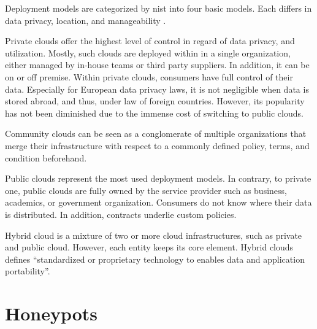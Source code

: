 Deployment models are categorized by \ac{nist} into four basic models.
Each differs in data privacy, location, and manageability \cite{Mell2011}.

Private clouds offer the highest level of control in regard of data privacy, and utilization. Mostly, such clouds are deployed within in a single organization, either managed by in-house teams or third party suppliers.
In addition, it can be on or off premise.
Within private clouds, consumers have full control of their data.
Especially for European data privacy laws, it is not negligible when data is stored abroad, and thus, under law of foreign countries.
However, its popularity has not been diminished due to the immense cost of switching to public clouds. \cite{Dillon2010, Mell2011}

Community clouds can be seen as a conglomerate of multiple organizations that merge their infrastructure with respect to a commonly defined policy, terms, and condition beforehand. \cite{Mell2011}

Public clouds represent the most used deployment models.
In contrary, to private one, public clouds are fully owned by the service provider such as business, academics, or government organization.
Consumers do not know where their data is distributed.
In addition, contracts underlie custom policies. \cite{Mell2011}

Hybrid cloud is a mixture of two or more cloud infrastructures, such as private and public cloud.
However, each entity keeps its core element.
Hybrid clouds defines \enquote{standardized or proprietary technology to enables data and application portability}\cite{Mell2011}.

\section{Honeypots}

